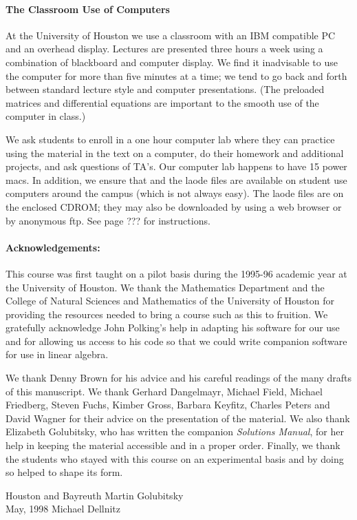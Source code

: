\documentclass{ximera}
\begin{document}
\paragraph{The Classroom Use of Computers}  At the University of Houston we
use a classroom with an IBM compatible PC and an overhead display.  Lectures 
are presented three hours a week using a combination of blackboard and 
computer display.  We find it inadvisable to use the computer for more than 
five minutes at a time; we tend to go back and forth between standard lecture 
style and computer presentations.  (The preloaded matrices and differential 
equations are important to the smooth use of the computer in class.)  

We ask students to enroll in a one hour computer lab where they can practice 
using the material in the text on a computer, do their homework and additional
projects, and ask questions of TA's.  Our computer lab happens to have 15 
power macs.  In addition, we ensure that \Matlab and the {\sf laode} files are
available on student use computers around the campus (which is not always 
easy).  The {\sf laode} files are on the enclosed CDROM; they may also be 
downloaded by using a web browser or by anonymous ftp.  See page ??? for 
instructions.

\paragraph{Acknowledgements:}  This course was first taught on a pilot basis 
during the 1995-96 academic year at the University of Houston.  We thank the 
Mathematics Department and the College of Natural Sciences and Mathematics of 
the University of Houston for providing the resources needed to bring a 
course such as this to fruition.  We gratefully acknowledge John Polking's 
help in adapting his software for our use and for allowing us access to his 
code so that we could write companion software for use in linear algebra.

We thank Denny Brown for his advice and his careful readings of the many 
drafts of this manuscript.  We thank Gerhard Dangelmayr, Michael Field, 
Michael Friedberg, Steven Fuchs, Kimber Gross, Barbara Keyfitz, Charles 
Peters and David Wagner for their advice on the presentation of the material. 
We also thank Elizabeth Golubitsky, who has written the companion 
{\em Solutions Manual\/}, for her help in keeping the material accessible and 
in a proper order.  Finally, we thank the students who stayed with this 
course on an experimental basis and by doing so helped to shape its form.

\vspace{0.1in}

\noindent Houston and Bayreuth \hfill Martin Golubitsky \\
May, 1998  \hfill Michael Dellnitz
\end{document}
